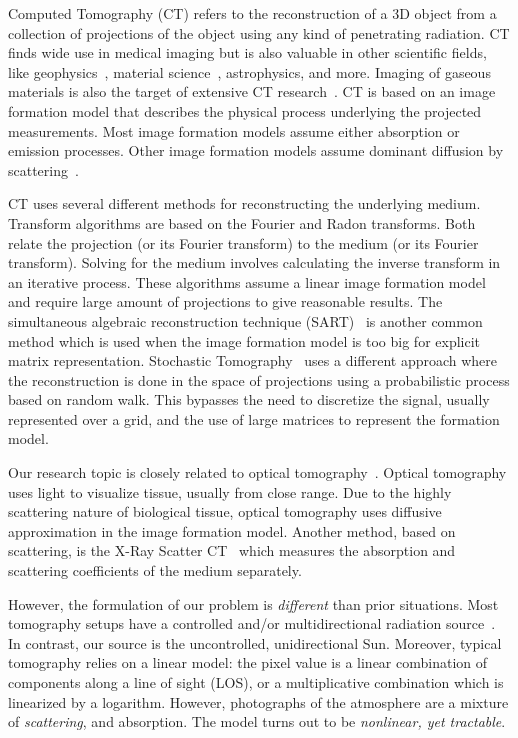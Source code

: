 \documentclass[10pt,letterpaper]{article}
\begin{document}
Computed Tomography (CT) refers to the reconstruction of a 3D object
from a collection of projections of the object using any kind of
penetrating radiation. CT finds wide use in medical imaging but is
also valuable in other scientific fields, like
geophysics~\cite{Kazahaya2008}, material science~\cite{Baruchel2000},
astrophysics, and more.  Imaging of gaseous materials is also the
target of extensive CT research~\cite{Price2001,Cosofret2009}. CT is
based on an image formation model that describes the physical process
underlying the projected measurements.  Most image formation models
assume either absorption or emission processes. Other image formation
models assume dominant diffusion by scattering~\cite{Boas2001}.

CT uses several different methods for reconstructing the underlying
medium. Transform algorithms are based on the Fourier and Radon
transforms. Both relate the projection (or its Fourier transform) to
the medium (or its Fourier transform). Solving for the medium involves
calculating the inverse transform in an iterative process.  These
algorithms assume a linear image formation model and require large
amount of projections to give reasonable results. The simultaneous
algebraic reconstruction technique
(SART)~\cite{KakAvinashC.andSlaney2001} is another common method which
is used when the image formation model is too big for explicit matrix
representation. Stochastic Tomography~\cite{gregson} uses a different
approach where the reconstruction is done in the space of projections
using a probabilistic process based on random walk. This bypasses the
need to discretize the signal, usually represented over a grid, and
the use of large matrices to represent the formation model.

Our research topic is closely related to optical
tomography~\cite{Arridge}. Optical tomography uses light to visualize
tissue, usually from close range.  Due to the highly scattering nature
of biological tissue, optical tomography uses diffusive approximation
in the image formation model.  Another method, based on scattering, is
the X-Ray Scatter CT~\cite{Aviles2011} which measures the absorption
and scattering coefficients of the medium separately.
 
However, the formulation of our problem is {\em different} than prior
situations. Most tomography setups have a controlled and/or
multidirectional radiation source~\cite{messer}. In contrast, our
source is the uncontrolled, unidirectional Sun. Moreover, typical
tomography relies on a linear model: the pixel value is a linear
combination of components along a line of sight (LOS), or a
multiplicative combination which is linearized by a logarithm.
However, photographs of the atmosphere are a mixture of {\em
  scattering}, and absorption. The model turns out to be {\em
  nonlinear, yet tractable}.
\end{document}

